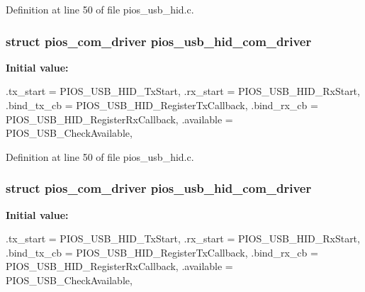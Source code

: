 \-Definition at line 50 of file pios\-\_\-usb\-\_\-hid.\-c.

\hypertarget{group___p_i_o_s___u_s_b___h_i_d_ga7bc5f832e095cad60f463436e377bb5d}{
\subsubsection[{pios\-\_\-usb\-\_\-hid\-\_\-com\-\_\-driver}]{\setlength{\rightskip}{0pt plus 5cm}struct {\bf pios\-\_\-com\-\_\-driver} {\bf pios\-\_\-usb\-\_\-hid\-\_\-com\-\_\-driver}}}\label{group___p_i_o_s___u_s_b___h_i_d_ga7bc5f832e095cad60f463436e377bb5d}
{\bfseries \-Initial value\-:}
\begin{DoxyCode}
 {
        .tx_start    = PIOS_USB_HID_TxStart,
        .rx_start    = PIOS_USB_HID_RxStart,
        .bind_tx_cb  = PIOS_USB_HID_RegisterTxCallback,
        .bind_rx_cb  = PIOS_USB_HID_RegisterRxCallback,
        .available   = PIOS_USB_CheckAvailable,
}
\end{DoxyCode}


\-Definition at line 50 of file pios\-\_\-usb\-\_\-hid.\-c.

\hypertarget{group___p_i_o_s___u_s_b___h_i_d_ga7bc5f832e095cad60f463436e377bb5d}{
\subsubsection[{pios\-\_\-usb\-\_\-hid\-\_\-com\-\_\-driver}]{\setlength{\rightskip}{0pt plus 5cm}struct {\bf pios\-\_\-com\-\_\-driver} {\bf pios\-\_\-usb\-\_\-hid\-\_\-com\-\_\-driver}}}\label{group___p_i_o_s___u_s_b___h_i_d_ga7bc5f832e095cad60f463436e377bb5d}
{\bfseries \-Initial value\-:}
\begin{DoxyCode}
 {
        .tx_start    = PIOS_USB_HID_TxStart,
        .rx_start    = PIOS_USB_HID_RxStart,
        .bind_tx_cb  = PIOS_USB_HID_RegisterTxCallback,
        .bind_rx_cb  = PIOS_USB_HID_RegisterRxCallback,
        .available   = PIOS_USB_CheckAvailable, 
}
\end{DoxyCode}


